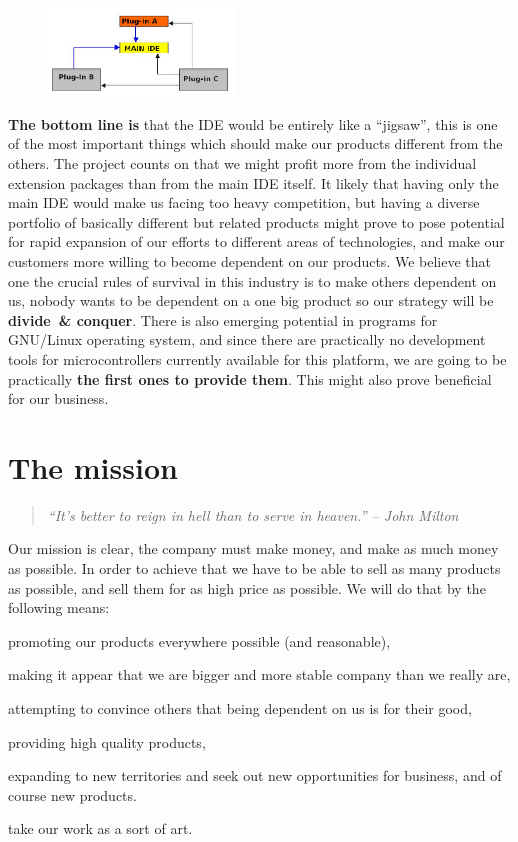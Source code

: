\documentclass[a4paper,twoside,15pt]{book}
\begin{document}
        \begin{figure}
            \centering{}
            \includegraphics[width=140pt]{images/a_diagram.png}
        \end{figure}

        \textbf{The bottom line is} that the IDE would be entirely like a ``jigsaw'', this is one of the most important things which should make our products different from the others. The project counts on that we might profit more from the individual extension packages than from the main IDE itself. It likely that having only the main IDE would make us facing too heavy competition, but having a diverse portfolio of basically different but related products might prove to pose potential for rapid expansion of our efforts to different areas of technologies, and make our customers more willing to become dependent on our products. We believe that one the crucial rules of survival in this industry is to make others dependent on us, nobody wants to be dependent on a one big product so our strategy will be \textbf{divide~\& conquer}. There is also emerging potential in programs for GNU/Linux operating system, and since there are practically no development tools for microcontrollers currently available for this platform, we are going to be practically \textbf{the first ones to provide them}. This might also prove beneficial for our business.

    \section{The mission}
        \begin{quote}
            \textit{``It's better to reign in hell than to serve in heaven.'' -- John Milton}
        \end{quote}

        Our mission is clear, the company must make money, and make as much money as possible. In order to achieve that we have to be able to sell as many products as possible, and sell them for as high price as possible. We will do that by the following means:
        \begin{dinglist}{73}
            \item promoting our products everywhere possible (and reasonable),
            \item making it appear that we are bigger and more stable company than we really are,
            \item attempting to convince others that being dependent on us is for their good,
            \item providing high quality products,
            \item expanding to new territories and seek out new opportunities for business, and of course new products.
            \item take our work as a sort of art.
        \end{dinglist}
\end{document}

